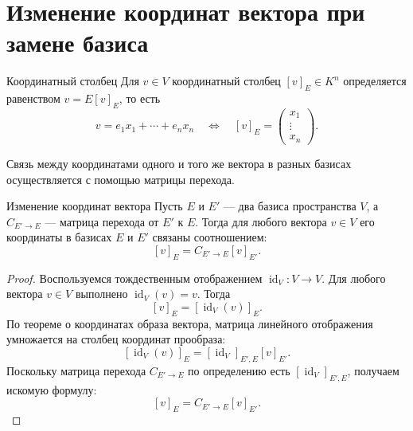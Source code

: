 
\section{Изменение координат вектора при замене базиса}


\begin{Definition}{Координатный столбец}{}
	Для $v\in V$ координатный столбец $[v]_E\in K^n$ определяется равенством
	$v=E[v]_E$, то есть
	\[
	v=e_1x_1+\cdots+e_nx_n
	\quad \Longleftrightarrow \quad
	[v]_E=
	\begin{pmatrix}
		x_1\\
		\vdots\\
		x_n
	\end{pmatrix}.
	\]
\end{Definition}

Связь между координатами одного и того же вектора в разных базисах осуществляется с помощью матрицы перехода.

\begin{Theorem}{Изменение координат вектора}{}
	Пусть $E$ и $E'$ --- два базиса пространства $V$, а $C_{E'\to E}$ --- матрица перехода от $E'$ к $E$. Тогда для любого вектора $v \in V$ его координаты в базисах $E$ и $E'$ связаны соотношением:
	\[
	[v]_E = C_{E'\to E} [v]_{E'}.
	\]
\end{Theorem}

\begin{proof}
	Воспользуемся тождественным отображением $\operatorname{id}_V \colon V \to V$. Для любого вектора $v \in V$ выполнено $\operatorname{id}_V(v) = v$.
	Тогда
	\[
	[v]_E = [\operatorname{id}_V(v)]_E.
	\]
	По теореме о координатах образа вектора, матрица линейного отображения умножается на столбец координат прообраза:
	\[
	[\operatorname{id}_V(v)]_E = [\operatorname{id}_V]_{E',E} [v]_{E'}.
	\]
	Поскольку матрица перехода $C_{E'\to E}$ по определению есть $[\operatorname{id}_V]_{E',E}$, получаем искомую формулу:
	\[
	[v]_E = C_{E'\to E} [v]_{E'}.
	\]
\end{proof}
